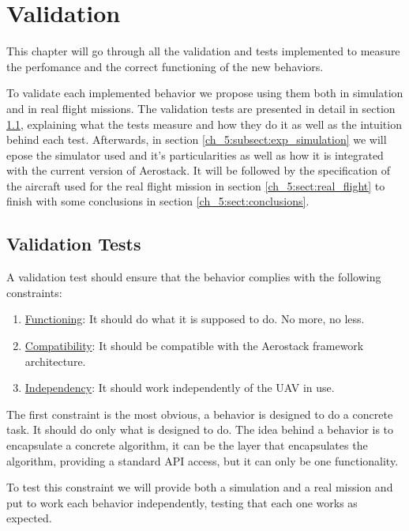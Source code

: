 \chapter{Validation}

  This chapter will go through all the validation and tests implemented to measure the perfomance and the correct functioning of the new behaviors. 

  To validate each implemented behavior we propose using them both in simulation and in real flight missions. The validation tests are presented in detail in section \ref{ch_5:sect:val_tests}, explaining what the tests measure and how they do it as well as the intuition behind each test. Afterwards, in section \ref{ch_5:subsect:exp_simulation} we will epose the simulator used and it's particularities as well as how it is integrated with the current version of Aerostack. It will be followed by the specification of the aircraft used for the real flight mission in section \ref{ch_5:sect:real_flight} to finish with some conclusions in section \ref{ch_5:sect:conclusions}.

\section{Validation Tests} \label{ch_5:sect:val_tests}

  A validation test should ensure that the behavior complies with the following constraints:

  \begin{enumerate}
    \item \underline{Functioning}: It should do what it is supposed to do. No more, no less.
    \item \underline{Compatibility}: It should be compatible with the Aerostack framework architecture.
    \item \underline{Independency}: It should work independently of the UAV in use.
  \end{enumerate}

  The first constraint is the most obvious, a behavior is designed to do a concrete task. It should do only what is designed to do. The idea behind a behavior is to encapsulate a concrete algorithm, it can be the layer that encapsulates the algorithm, providing a standard API access, but it can only be one functionality.

  To test this constraint we will provide both a simulation and a real mission and put to work each behavior independently, testing that each one works as expected.

